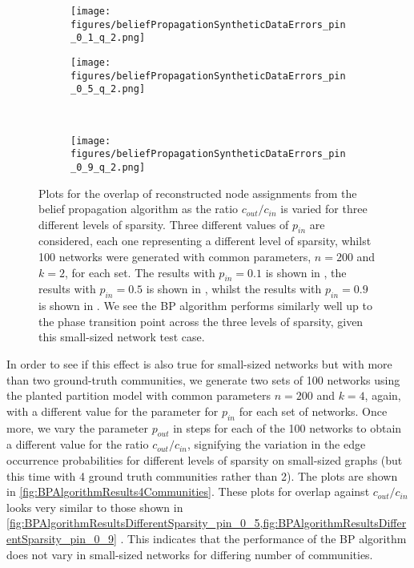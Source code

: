 \begin{figure}
\centering
	\begin{subfigure}{.5\textwidth}
		\centering
		\texttt{[image: figures/beliefPropagationSyntheticDataErrors\_pin\_0\_1\_q\_2.png]}
		\caption{}
		\label{fig:BPAlgorithmResultsDifferentSparsity_pin_0_1}
	\end{subfigure}%
	\begin{subfigure}{.5\textwidth}
		\centering
		\texttt{[image: figures/beliefPropagationSyntheticDataErrors\_pin\_0\_5\_q\_2.png]}
		\caption{}
		\label{fig:BPAlgorithmResultsDifferentSparsity_pin_0_5}
	\end{subfigure}\\
	\begin{subfigure}{.5\textwidth}
		\centering
		\texttt{[image: figures/beliefPropagationSyntheticDataErrors\_pin\_0\_9\_q\_2.png]}
		\caption{}
		\label{fig:BPAlgorithmResultsDifferentSparsity_pin_0_9}
	\end{subfigure}
	\caption[Plot of overlap for belief propagation algorithm on small-sized networks with three different levels of sparsity.]{\label{fig:BPAlgorithmResultsDifferentSparsity} Plots for the overlap of reconstructed node assignments from the belief propagation algorithm as the ratio $c_{out}/c_{in}$ is varied for three different levels of sparsity. Three different values of $p_{in}$ are considered, each one representing a different level of sparsity, whilst 100 networks were generated with common parameters, $n = 200$ and $k = 2$, for each set. The results with $p_{in} = 0.1$ is shown in , the results with $p_{in} = 0.5$ is shown in , whilst the results with $p_{in} = 0.9$ is shown in . We see the BP algorithm performs similarly well up to the phase transition point across the three levels of sparsity, given this small-sized network test case.}
\end{figure}

In order to see if this effect is also true for small-sized networks but with more than two ground-truth communities, we generate two sets of 100 networks using the planted partition model with common parameters $n = 200$ and $k = 4$, again, with a different value for the parameter for $p_{in}$ for each set of networks.
Once more, we vary the parameter $p_{out}$ in steps for each of the 100 networks to obtain a different value for the ratio $c_{out}/c_{in}$, signifying the variation in the edge occurrence probabilities for different levels of sparsity on small-sized graphs (but this time with 4 ground truth communities rather than 2).
The plots are shown in \cref{fig:BPAlgorithmResults4Communities}.
These plots for overlap against $c_{out}/c_{in}$ looks very similar to those shown in \cref{fig:BPAlgorithmResultsDifferentSparsity_pin_0_5,fig:BPAlgorithmResultsDifferentSparsity_pin_0_9} .
This indicates that the performance of the BP algorithm does not vary in small-sized networks for differing number of communities.

